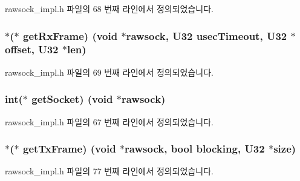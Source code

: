 rawsock\+\_\+impl.\+h 파일의 68 번째 라인에서 정의되었습니다.

\subsubsection[{\texorpdfstring{get\+Rx\+Frame}{getRxFrame}}]{$\ast$($\ast$ get\+Rx\+Frame) (void $\ast$rawsock, {\bf U32} usec\+Timeout, {\bf U32} $\ast$offset, {\bf U32} $\ast$len)}\hypertarget{structrawsock__cb__t_ae9c0b8e9e26d88a6d7ef3191fec6cd5a}{}\label{structrawsock__cb__t_ae9c0b8e9e26d88a6d7ef3191fec6cd5a}


rawsock\+\_\+impl.\+h 파일의 69 번째 라인에서 정의되었습니다.

\subsubsection[{\texorpdfstring{get\+Socket}{getSocket}}]{\setlength{\rightskip}{0pt plus 5cm}int($\ast$ get\+Socket) (void $\ast$rawsock)}\hypertarget{structrawsock__cb__t_a07a3216facf720770cc7a9f92d86496c}{}\label{structrawsock__cb__t_a07a3216facf720770cc7a9f92d86496c}


rawsock\+\_\+impl.\+h 파일의 67 번째 라인에서 정의되었습니다.

\subsubsection[{\texorpdfstring{get\+Tx\+Frame}{getTxFrame}}]{$\ast$($\ast$ get\+Tx\+Frame) (void $\ast$rawsock, {\bf bool} blocking, {\bf U32} $\ast${\bf size})}\hypertarget{structrawsock__cb__t_abac4c30aae337d681176b220b37237fc}{}\label{structrawsock__cb__t_abac4c30aae337d681176b220b37237fc}


rawsock\+\_\+impl.\+h 파일의 77 번째 라인에서 정의되었습니다.

